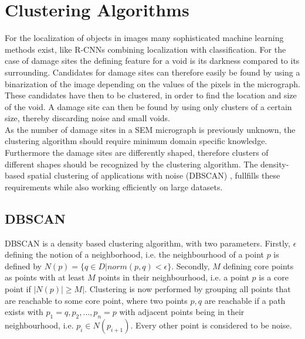 \section{Clustering Algorithms}

For the localization of objects in images many sophisticated machine learning methods exist, like R-CNNs combining localization with classification. For the case of damage sites the defining feature for a void is its darkness compared to its surrounding. Candidates for damage sites can therefore easily be found by using a binarization of the image depending on the values of the pixels in the micrograph. These candidates have then to be clustered, in order to find the location and size of the void. A damage site can then be found by using only clusters of a certain size, thereby discarding noise and small voids. \\

As the number of damage sites in a SEM micrograph is previously unknown, the clustering algorithm should require minimum domain specific knowledge. Furthermore the damage sites are differently shaped, therefore clusters of different shapes should be recognized by the clustering algorithm. The density-based spatial clustering of applications with noise (DBSCAN) \cite{Ester:1996:DAD:3001460.3001507}, fullfills these requirements while also working efficiently on large datasets. 

\subsection{DBSCAN}
DBSCAN is a density based clustering algorithm, with two parameters. Firstly, $\epsilon$ defining the notion of a neighborhood, i.e. the neighbourhood of a point $p$ is defined by $N(p) = \{ q \in D | norm(p,q)<\epsilon\}$. Secondly, $M$ defining core points as points with at least $M$ points in their neighbourhood, i.e. a point $p$ is a core point if $|N(p)| \geq M|$. Clustering is now performed by grouping all points that are reachable to some core point, where two points $p,q$ are reachable if a path exists with $p_1=q,p_2,\dots,p_n=p$ with adjacent points being in their neighbourhood, i.e. $p_i\in N(p_{i+1})$. Every other point is considered to be noise. \\


